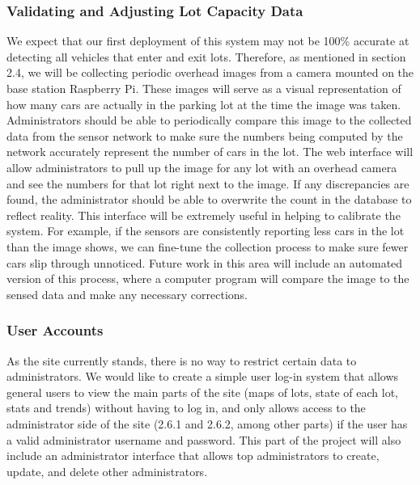 \documentclass[11pt, oneside, fullpage, doublespace]{article}
\begin{document}
\subsubsection{Validating and Adjusting Lot Capacity Data}
We expect that our first deployment of this system may not be 100\% accurate at detecting all vehicles that enter and exit lots. Therefore, as mentioned in section 2.4, we will be collecting periodic overhead images from a camera mounted on the base station Raspberry Pi. These images will serve as a visual representation of how many cars are actually in the parking lot at the time the image was taken. Administrators should be able to periodically compare this image to the collected data from the sensor network to make sure the numbers being computed by the network accurately represent the number of cars in the lot. The web interface will allow administrators to pull up the image for any lot with an overhead camera and see the numbers for that lot right next to the image. If any discrepancies are found, the administrator should be able to overwrite the count in the database to reflect reality. This interface will be extremely useful in helping to calibrate the system. For example, if the sensors are consistently reporting less cars in the lot than the image shows, we can fine-tune the collection process to make sure fewer cars slip through unnoticed. Future work in this area will include an automated version of this process, where a computer program will compare the image to the sensed data and make any necessary corrections.

\subsubsection{User Accounts}
As the site currently stands, there is no way to restrict certain data to administrators. We would like to create a simple user log-in system that allows general users to view the main parts of the site (maps of lots, state of each lot, stats and trends) without having to log in, and only allows access to the administrator side of the site (2.6.1 and 2.6.2, among other parts) if the user has a valid administrator username and password. This part of the project will also include an administrator interface that allows top administrators to create, update, and delete other administrators.
\end{document}
